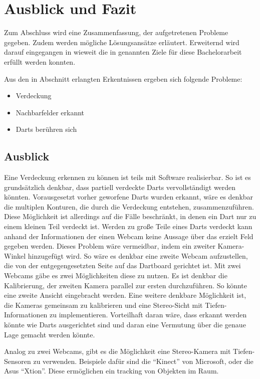 \chapter{Ausblick und Fazit}
\label{chap:prospect}
Zum Abschluss wird eine Zusammenfassung, der aufgetretenen Probleme gegeben. Zudem werden mögliche Lösungsansätze erläutert. Erweiternd wird darauf eingegangen in wieweit die in  genannten Ziele für diese Bachelorarbeit erfüllt werden konnten.

Aus den in Abschnitt  erlangten Erkentnissen ergeben sich folgende Probleme:
\begin{itemize}
	\item Verdeckung
	\item Nachbarfelder erkannt
	\item Darts berühren sich
\end{itemize}

\section*{Ausblick}
Eine Verdeckung erkennen zu können ist teils mit Software realisierbar. So ist es grundsätzlich denkbar, dass partiell verdeckte Darts vervollständigt werden könnten. Vorausgesetzt vorher geworfene Darts wurden erkannt, wäre es denkbar die multiplen Konturen, die durch die Verdeckung entstehen, zusammenzuführen. Diese Möglichkeit ist allerdings auf die Fälle beschränkt, in denen ein Dart nur zu einem kleinen Teil verdeckt ist. Werden zu große Teile eines Darts verdeckt kann anhand der Informationen der einen Webcam keine Aussage über das erzielt Feld gegeben werden. 
Dieses Problem wäre vermeidbar, indem ein zweiter Kamera-Winkel hinzugefügt wird. 
So wäre es denkbar eine zweite Webcam aufzustellen, die von der entgegengesetzten Seite auf das Dartboard gerichtet ist. Mit zwei Webcams gäbe es zwei Möglichkeiten diese zu nutzen. 
Es ist denkbar die Kalibrierung, der zweiten Kamera parallel zur ersten durchzuführen. So könnte eine zweite Ansicht eingebracht werden. 
Eine weitere denkbare Möglichkeit ist, die Kameras gemeinsam zu kalibrieren und eine Stereo-Sicht mit Tiefen-Informationen zu implementieren. Vorteilhaft daran wäre, dass erkannt werden könnte wie Darts ausgerichtet sind und daran eine Vermutung über die genaue Lage gemacht werden könnte. 

Analog zu zwei Webcams, gibt es die Möglichkeit eine Stereo-Kamera mit Tiefen-Sensoren zu verwenden. Beispiele dafür sind die "`Kinect"' von Microsoft, oder die Asus "`Xtion"'. Diese ermöglichen ein tracking von Objekten im Raum.

